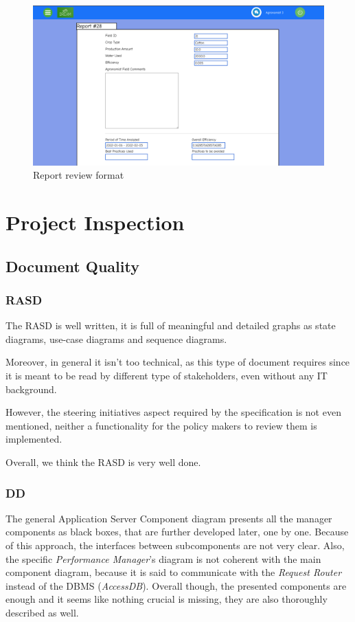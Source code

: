 \documentclass[table, 12pt]{article}
\begin{document}
\begin{figure}[H]
    \centering
    \includegraphics[scale=0.3]{assets/report_review.png}
    \caption{Report review format}
    \label{fig: report_review}
\end{figure}


\section{Project Inspection}

\subsection{Document Quality}
\subsubsection{RASD}
The RASD is well written, it is full of meaningful and detailed graphs as state diagrams, use-case diagrams and sequence diagrams. 

Moreover, in general it isn't too technical, as this type of document requires since it is meant to be read by different type of stakeholders, even without any IT background.

However, the steering initiatives aspect required by the specification is not even mentioned, neither a functionality for the policy makers to review them is implemented.

Overall, we think the RASD is very well done.

\subsubsection{DD}
The general Application Server Component diagram presents all the manager components as black boxes, that are further developed later, one by one. Because of this approach, the interfaces between subcomponents are not very clear. Also, the specific \emph{Performance Manager}'s diagram is not coherent with the main component diagram, because it is said to communicate with the \textit{Request Router} instead of the DBMS (\textit{AccessDB}).
Overall though, the presented components are enough and it seems like nothing crucial is missing, they are also thoroughly described as well.
\end{document}
